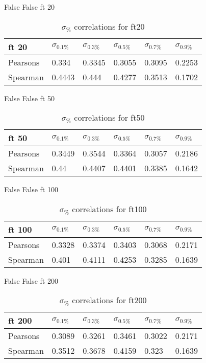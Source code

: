 \documentclass{sig-alternate}
\begin{document}
False False ft 20
\begin{table}[h!]
\centering
\caption{$\sigma_{\%}$ correlations for ft20}
\begin{tabular}{|l|l|l|l|l|l|}
\hline
ft 20 & $\sigma_{0.1\%}$ & $\sigma_{0.3\%}$ & $\sigma_{0.5\%}$ & $\sigma_{0.7\%}$ & $\sigma_{0.9\%}$ \\ \hline
Pearsons  & 0.334 & 0.3345 & 0.3055 & 0.3095 & 0.2253 \\ \hline
Spearman  & 0.4443 & 0.444 & 0.4277 & 0.3513 & 0.1702 \\ \hline
\end{tabular}
\end{table}
False False ft 50
\begin{table}[h!]
\centering
\caption{$\sigma_{\%}$ correlations for ft50}
\begin{tabular}{|l|l|l|l|l|l|}
\hline
ft 50 & $\sigma_{0.1\%}$ & $\sigma_{0.3\%}$ & $\sigma_{0.5\%}$ & $\sigma_{0.7\%}$ & $\sigma_{0.9\%}$ \\ \hline
Pearsons  & 0.3449 & 0.3544 & 0.3364 & 0.3057 & 0.2186 \\ \hline
Spearman  & 0.44 & 0.4407 & 0.4401 & 0.3385 & 0.1642 \\ \hline
\end{tabular}
\end{table}
False False ft 100
\begin{table}[h!]
\centering
\caption{$\sigma_{\%}$ correlations for ft100}
\begin{tabular}{|l|l|l|l|l|l|}
\hline
ft 100 & $\sigma_{0.1\%}$ & $\sigma_{0.3\%}$ & $\sigma_{0.5\%}$ & $\sigma_{0.7\%}$ & $\sigma_{0.9\%}$ \\ \hline
Pearsons  & 0.3328 & 0.3374 & 0.3403 & 0.3068 & 0.2171 \\ \hline
Spearman  & 0.401 & 0.4111 & 0.4253 & 0.3285 & 0.1639 \\ \hline
\end{tabular}
\end{table}
False False ft 200
\begin{table}[h!]
\centering
\caption{$\sigma_{\%}$ correlations for ft200}
\begin{tabular}{|l|l|l|l|l|l|}
\hline
ft 200 & $\sigma_{0.1\%}$ & $\sigma_{0.3\%}$ & $\sigma_{0.5\%}$ & $\sigma_{0.7\%}$ & $\sigma_{0.9\%}$ \\ \hline
Pearsons  & 0.3089 & 0.3261 & 0.3461 & 0.3022 & 0.2171 \\ \hline
Spearman  & 0.3512 & 0.3678 & 0.4159 & 0.323 & 0.1639 \\ \hline
\end{tabular}
\end{table}
\end{document}
